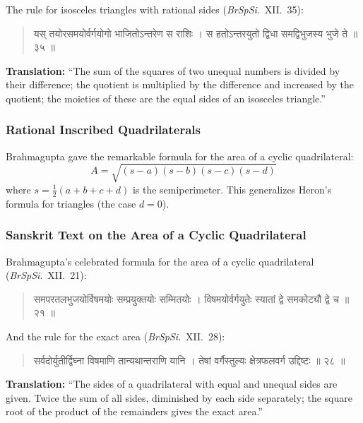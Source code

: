 \documentclass[11pt,a4paper]{article}
\newcommand{\dev}[1]{{\devanagarifont #1}}
\newenvironment{sanskritverse}{%
  \begin{quote}
  \devanagarifont
  \small
  \color{titlecolor}
}{\end{quote}}
\theoremstyle{definition}
\begin{document}
The rule for isosceles triangles with rational sides (\textit{BrSpSi}.\ XII.\ 35):

\begin{sanskritverse}
\dev{यस् तयोरसमयोर्वर्गयोगो भाजितोऽन्तरेण स राशिः ।}
\dev{स हतोऽन्तरयुतो द्विधा समद्विभुजस्य भुजे ते ॥ ३५ ॥}
\end{sanskritverse}

\textbf{Translation:} ``The sum of the squares of two unequal numbers is divided by their difference; the quotient is multiplied by the difference and increased by the quotient; the moieties of these are the equal sides of an isosceles triangle.''

\vspace{0.3cm}

\subsubsection{Rational Inscribed Quadrilaterals}

Brahmagupta gave the remarkable formula for the area of a cyclic quadrilateral:
\[
A = \sqrt{(s-a)(s-b)(s-c)(s-d)}
\]
where $s = \frac{1}{2}(a+b+c+d)$ is the semiperimeter. This generalizes Heron's formula for triangles (the case $d = 0$).

\subsubsection{Sanskrit Text on the Area of a Cyclic Quadrilateral}

Brahmagupta's celebrated formula for the area of a cyclic quadrilateral (\textit{BrSpSi}.\ XII.\ 21):

\begin{sanskritverse}
\dev{समपरतलभुजयोर्विषमयोः सम्प्रयुक्तयोः सम्मितयोः ।}
\dev{विषमयोर्वर्गयुतेः स्यातां द्वे समकोट्यौ द्वे च ॥ २१ ॥}
\end{sanskritverse}

And the rule for the exact area (\textit{BrSpSi}.\ XII.\ 28):

\begin{sanskritverse}
\dev{सर्वदोर्युतीर्द्विघ्ना विषमाणि तान्यथान्तराणि यानि ।}
\dev{तेषां वर्गैस्तुल्यः क्षेत्रफलवर्ग उद्दिष्टः ॥ २८ ॥}
\end{sanskritverse}

\textbf{Translation:} ``The sides of a quadrilateral with equal and unequal sides are given. Twice the sum of all sides, diminished by each side separately; the square root of the product of the remainders gives the exact area.''
\end{document}
